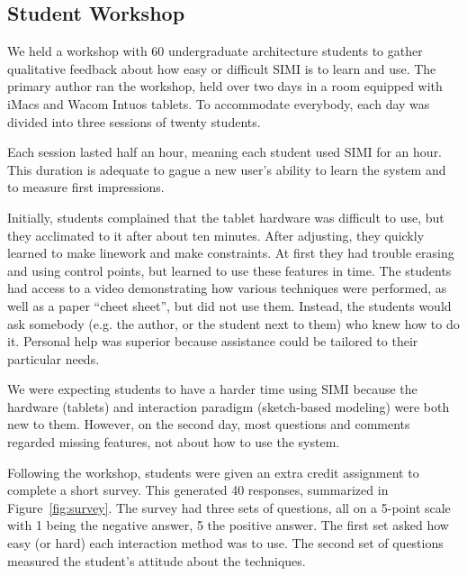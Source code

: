 \documentclass{article}
\begin{document}
\subsection{Student Workshop}

We held a workshop with 60 undergraduate architecture students to
gather qualitative feedback about how easy or difficult SIMI is to
learn and use. The primary author ran the workshop, held over two days
in a room equipped with iMacs and Wacom Intuos tablets. To accommodate
everybody, each day was divided into three sessions of twenty
students.

Each session lasted half an hour, meaning each student used SIMI for
an hour. This duration is adequate to gague a new user's ability to
learn the system and to measure first impressions.



Initially, students complained that the tablet hardware was difficult
to use, but they acclimated to it after about ten minutes. After
adjusting, they quickly learned to make linework and make
constraints. At first they had trouble erasing and using control
points, but learned to use these features in time. The students had
access to a video demonstrating how various techniques were performed,
as well as a paper ``cheet sheet'', but did not use them. Instead, the
students would ask somebody (e.g. the author, or the student next to
them) who knew how to do it. Personal help was superior because
assistance could be tailored to their particular needs.


We were expecting students to have a harder time using SIMI because
the hardware (tablets) and interaction paradigm (sketch-based
modeling) were both new to them. However, on the second day, most
questions and comments regarded missing features, not about how to use
the system. 

Following the workshop, students were given an extra credit assignment
to complete a short survey. This generated 40 responses, summarized in
Figure~\ref{fig:survey}. The survey had three sets of questions, all
on a 5-point scale with 1 being the negative answer, 5 the positive
answer. The first set asked how easy (or hard) each interaction method
was to use. The second set of questions measured the student's
attitude about the techniques.
\end{document}
